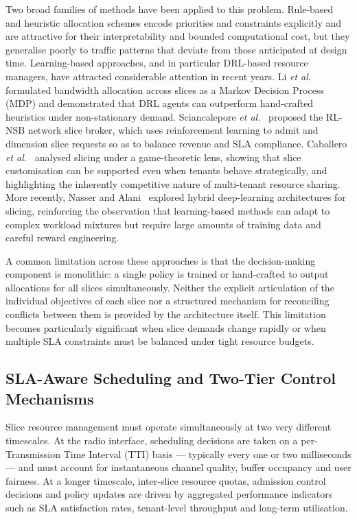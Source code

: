 Two broad families of methods have been applied to this problem. Rule-based and heuristic allocation schemes encode priorities and constraints explicitly and are attractive for their interpretability and bounded computational cost, but they generalise poorly to traffic patterns that deviate from those anticipated at design time. Learning-based approaches, and in particular DRL-based resource managers, have attracted considerable attention in recent years. Li \emph{et al.}~\cite{li2018drl} formulated bandwidth allocation across slices as a Markov Decision Process (MDP) and demonstrated that DRL agents can outperform hand-crafted heuristics under non-stationary demand. Sciancalepore \emph{et al.}~\cite{sciancalepore2019rlnsb} proposed the RL-NSB network slice broker, which uses reinforcement learning to admit and dimension slice requests so as to balance revenue and SLA compliance. Caballero \emph{et al.}~\cite{caballero2019games} analysed slicing under a game-theoretic lens, showing that slice customisation can be supported even when tenants behave strategically, and highlighting the inherently competitive nature of multi-tenant resource sharing. More recently, Nasser and Alani~\cite{nasser2025hybrid} explored hybrid deep-learning architectures for slicing, reinforcing the observation that learning-based methods can adapt to complex workload mixtures but require large amounts of training data and careful reward engineering.

A common limitation across these approaches is that the decision-making component is monolithic: a single policy is trained or hand-crafted to output allocations for all slices simultaneously. Neither the explicit articulation of the individual objectives of each slice nor a structured mechanism for reconciling conflicts between them is provided by the architecture itself. This limitation becomes particularly significant when slice demands change rapidly or when multiple SLA constraints must be balanced under tight resource budgets.

\subsection{SLA-Aware Scheduling and Two-Tier Control Mechanisms}

Slice resource management must operate simultaneously at two very different timescales. At the radio interface, scheduling decisions are taken on a per-Transmission Time Interval (TTI) basis --- typically every one or two milliseconds --- and must account for instantaneous channel quality, buffer occupancy and user fairness. At a longer timescale, inter-slice resource quotas, admission control decisions and policy updates are driven by aggregated performance indicators such as SLA satisfaction rates, tenant-level throughput and long-term utilisation.

